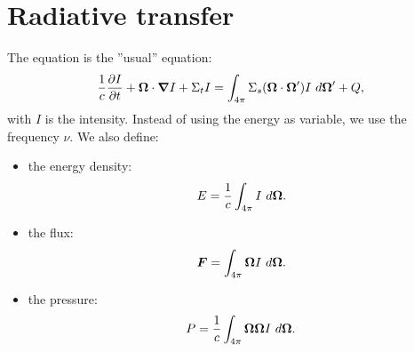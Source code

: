 \section{Radiative transfer}
The equation is the ''usual'' equation:
\begin{equation}
  \frac{1}{c}\frac{\partial I}{\partial t} + \boldsymbol{\Omega}\cdot \boldsymbol{\nabla} I + \Sigma_t I =
  \int_{4\pi} \Sigma_s(\boldsymbol{\Omega}\cdot\boldsymbol{\Omega}') I\ d\boldsymbol{\Omega}' + Q,
\end{equation}
with $I$ is the intensity. Instead of using the energy as variable, we use the
frequency $\nu$.  We also define:
\begin{itemize}
  \item the energy density:
    \begin{equation}
      E = \frac{1}{c}\int_{4\pi} I\ d\boldsymbol{\Omega}.
    \end{equation}
  \item the flux:
    \begin{equation}
      \boldsymbol{F} = \int_{4\pi} \boldsymbol{\Omega} I\ d\boldsymbol{\Omega}.
    \end{equation}
  \item the pressure:
    \begin{equation}
      P = \frac{1}{c}\int_{4\pi}\boldsymbol{\Omega}\boldsymbol{\Omega} I\ d\boldsymbol{\Omega}.
    \end{equation}
\end{itemize}

